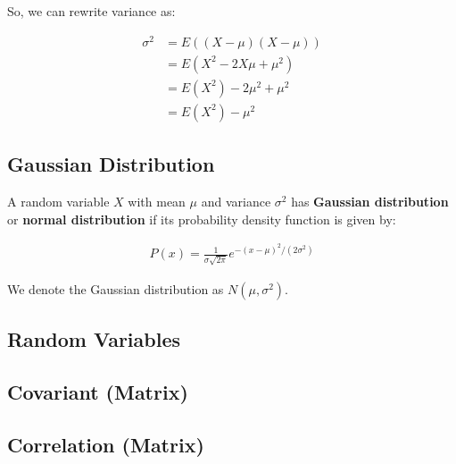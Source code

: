 \documentclass[11pt]{article}
\begin{document}
So, we can rewrite variance as:

\begin{align*}
    \sigma^{2} &= E\left(\left( X - \mu \right)\left( X - \mu \right)\right) \\
    &= E\left( X^{2} - 2X\mu + \mu^{2} \right) \\
    &= E\left( X^{2} \right) - 2\mu^{2} + \mu^{2} \\
    &= E\left( X^{2} \right) - \mu^{2}
\end{align*}

\subsection{Gaussian Distribution}
\label{sec:org3b5f563}
A random variable \(X\) with mean \(\mu\) and variance \(\sigma^{2}\) has \textbf{Gaussian distribution} or \textbf{normal distribution} if its probability density function is given by:

\begin{align*}
    P\left( x \right) = \frac{1}{\sigma\sqrt{2\pi}}e^{-\left( x - \mu \right)^{2}/\left(2\sigma^{2}\right)}
\end{align*}

We denote the Gaussian distribution as \(N\left( \mu,\sigma^{2} \right)\).

\subsection{Random Variables}
\label{sec:orgf0a1260}
\subsection{Covariant (Matrix)}
\label{sec:org5ec7bb7}
\subsection{Correlation (Matrix)}
\label{sec:org1feb61c}
\end{document}
